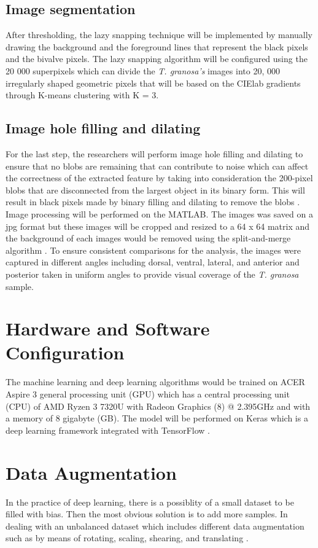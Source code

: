 \subsection{Image segmentation}
After thresholding, the lazy snapping technique will be implemented by manually drawing the background and the foreground lines that represent the black pixels and the bivalve pixels. The lazy snapping algorithm will be configured using the 20 000 superpixels which can divide the \textit{T. granosa’s} images into 20, 000 irregularly shaped geometric pixels that will be based on the CIElab gradients through K-means clustering with K = 3.

\subsection{Image hole filling and dilating}
For the last step, the researchers will perform image hole filling and dilating to ensure that no blobs are remaining that can contribute to noise which can affect the correctness of the extracted feature by taking into consideration the 200-pixel blobs that are disconnected from the largest object in its binary form. This will result in black pixels made by binary filling and dilating to remove the blobs \cite{concepcion2023}.
Image processing will be performed on the MATLAB. The images was saved on a jpg format but these images will be cropped and resized to a 64 x 64 matrix and the background of each images would be removed using the split-and-merge algorithm \cite{cui2020}. 
To ensure consistent comparisons for the analysis, the images were captured in different angles including dorsal, ventral, lateral, and anterior and posterior taken in uniform angles to provide visual coverage of the \textit{T. granosa} sample. 

\section{Hardware and Software Configuration}
The machine learning and deep learning algorithms would be trained on ACER Aspire 3 general processing unit (GPU) which has a central processing unit (CPU) of  AMD Ryzen 3 7320U with Radeon Graphics (8) @ 2.395GHz and with a memory of 8 gigabyte (GB). The model will be performed on Keras which is a deep learning framework integrated with TensorFlow \cite{cui2020}.

\section{Data Augmentation}
In the practice of deep learning, there is a possiblity of a small dataset to be filled with bias. Then the most obvious solution is to add more samples. In dealing with an unbalanced dataset which includes different data augmentation such as by means of rotating, scaling, shearing, and translating \cite{cui2020}.

